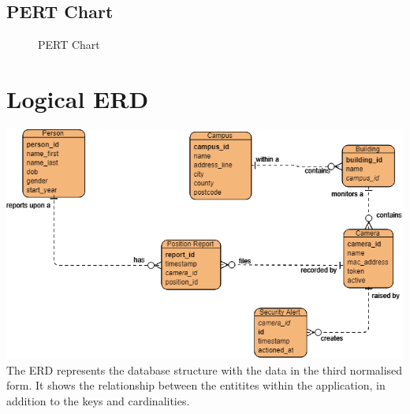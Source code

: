 \documentclass[
  english,
  a4paper,
,tablecaptionabove
]{scrartcl}
\begin{document}
\newpage

\begin{landscape}

\pagestyle{empty}

\hypertarget{pert-chart}{%
\section{PERT Chart}\label{pert-chart}}

\begin{figure}
    \caption{PERT Chart} \label{fig:pert-chart}
\end{figure}

\end{landscape}

\newpage

\hypertarget{logical-erd}{%
\section{Logical ERD}\label{logical-erd}}

\includegraphics{images/ppm-images/logical-erd.png} The ERD represents
the database structure with the data in the third normalised form. It
shows the relationship between the entitites within the application, in
addition to the keys and cardinalities.
\end{document}
